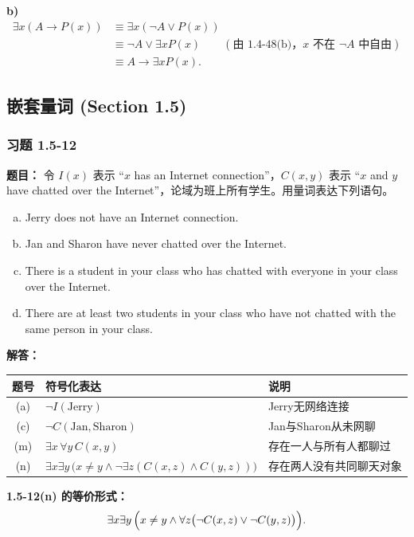\documentclass[11pt,UTF8]{article}
\begin{document}
\textbf{b)}
\begin{align*}
\exists x (A \to P(x))
&\equiv \exists x (\neg A \lor P(x)) \\
&\equiv \neg A \lor \exists x P(x) \qquad (\text{由 1.4-48(b)，}x\text{ 不在 }\neg A\text{ 中自由}) \\
&\equiv A \to \exists x P(x).
\end{align*}



\subsection{嵌套量词 (Section 1.5)}

\subsubsection*{习题 1.5-12}
\textbf{题目：} 令 $I(x)$ 表示 ``$x$ has an Internet connection''，$C(x,y)$ 表示 ``$x$ and $y$ have chatted over the Internet''，论域为班上所有学生。用量词表达下列语句。
\begin{enumerate}[a)]
    \item Jerry does not have an Internet connection.
    \item[(c)] Jan and Sharon have never chatted over the Internet.
    \item[(m)] There is a student in your class who has chatted with everyone in your class over the Internet.
    \item[(n)] There are at least two students in your class who have not chatted with the same person in your class.
\end{enumerate}

\textbf{解答：}
\begin{center}
\begin{tabular}{c|l|l}
\hline
题号 & 符号化表达 & 说明 \\
\hline
(a) & $\neg I(\text{Jerry})$ & Jerry无网络连接 \\
(c) & $\neg C(\text{Jan},\text{Sharon})$ & Jan与Sharon从未网聊 \\
(m) & $\exists x\,\forall y\, C(x,y)$ & 存在一人与所有人都聊过 \\
(n) & $\exists x\exists y\,\bigl(x\neq y \land \neg\exists z(C(x,z)\land C(y,z))\bigr)$ & 存在两人没有共同聊天对象 \\
\hline
\end{tabular}
\end{center}

\textbf{1.5-12(n) 的等价形式：}
\[ \exists x\exists y\,\Bigl(x\neq y \land \forall z\bigl(\neg C(x,z)\lor \neg C(y,z)\bigr)\Bigr). \]
\end{document}
